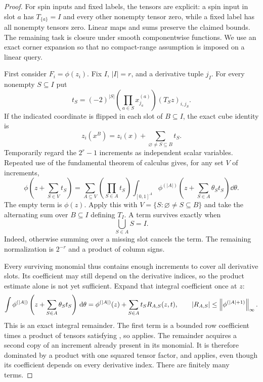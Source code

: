 \begin{proof}
For spin inputs and fixed labels, the tensors are explicit: a spin
input in slot $a$ has $T_{\{a\}}=I$ and every other nonempty tensor
zero, while a fixed label has all nonempty tensors zero.  Linear maps
and sums preserve the claimed bounds.  The remaining task is closure
under smooth componentwise functions.  We use an exact corner expansion
so that no compact-range assumption is imposed on a linear query.

First consider $F_i=\phi(z_i)$.  Fix $I$, $|I|=r$, and a derivative
tuple $j_I$.  For every nonempty $S\subseteq I$ put
\[
 t_S=(-2)^{|S|}\left(\prod_{a\in S}x_{j_a}^{(a)}\right)
                       (T_Sz)_{i,j_S}.
\]
If the indicated coordinate is flipped in each slot of $B\subseteq I$,
the exact cube identity is
\begin{equation}
 z_i(x^B)=z_i(x)+\sum_{\varnothing\ne S\subseteq B}t_S.
 \label{eq:path-corner-increments}
\end{equation}
Temporarily regard the $2^r-1$ increments as independent scalar
variables.  Repeated use of the fundamental theorem of calculus gives,
for any set $V$ of increments,
\begin{equation}
 \phi\left(z+\sum_{S\in V}t_S\right)
 =\sum_{A\subseteq V}\left(\prod_{S\in A}t_S\right)
   \int_{[0,1]^A}\phi^{(|A|)}
           \left(z+\sum_{S\in A}\theta_St_S\right)\dd\theta.
 \label{eq:path-anchored-expansion}
\end{equation}
The empty term is $\phi(z)$.  Apply this with
$V=\{S:\varnothing\ne S\subseteq B\}$ and take the alternating sum
over $B\subseteq I$ defining $T_I$.  A term survives exactly when
\begin{equation}
 \bigcup_{S\in A}S=I.
 \label{eq:path-covering}
\end{equation}
Indeed, otherwise summing over a missing slot cancels the term.
The remaining normalization is $2^{-r}$ and a product of column signs.

Every surviving monomial thus contains enough increments to cover all
derivative slots.  Its coefficient may still depend on the derivative
indices, so the product estimate alone is not yet sufficient.  Expand
that integral coefficient once at $z$:
\[
 \int\phi^{(|A|)}\left(z+\sum_{S\in A}\theta_St_S\right)\,\mathrm d\theta
 =\phi^{(|A|)}(z)+\sum_{S\in A}t_SR_{A,S}(z,t),
 \qquad |R_{A,S}|\le\left\lVert \phi^{(|A|+1)}\right\rVert_\infty.
\]
This is an exact integral remainder.  The first term is a bounded
row coefficient times a product of tensors satisfying
, so  applies.
The remainder acquires a second copy of an increment already present
in its monomial.  It is therefore dominated by a product with one
squared tensor factor,
and  applies, even though its coefficient
depends on every derivative index.  There are finitely many terms.


\end{proof}
